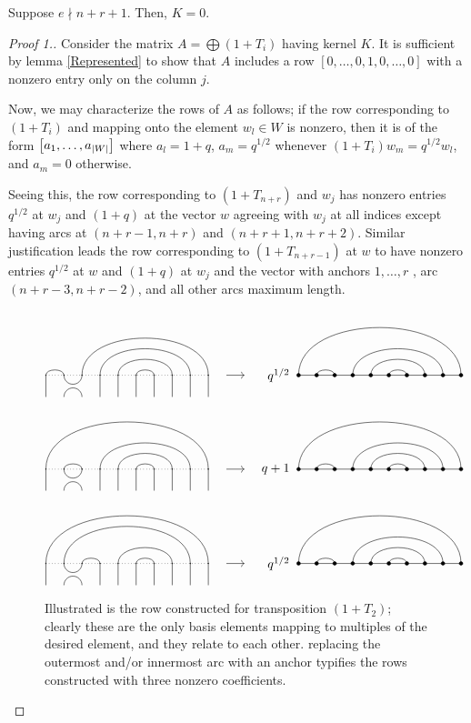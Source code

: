 \documentclass{amsart}
\begin{document}
\begin{lemma}\label{Trivial}
  Suppose $e \nmid n + r + 1$.
  Then, $K = 0$.
\end{lemma}
\begin{proof}[Proof 1.]
  Consider the matrix $A = \bigoplus (1 + T_i)$ having kernel $K$.
  It is sufficient by lemma \ref{Represented} to show that $A$ includes a row $[0,\dots,0,1,0,\dots,0]$ with a nonzero entry only on the column $j$.

  Now, we may characterize the rows of $A$ as follows;
  if the row corresponding to $(1 + T_i)$ and mapping onto the element $w_l \in W$ is nonzero, then it is of the form $\left[ a_1,\dots,a_{\left| W \right|} \right]$ where $a_l = 1 + q$, $a_m = q^{1/2}$ whenever $(1 + T_i)w_m = q^{1/2}w_l$, and $a_m = 0$ otherwise.
  
  Seeing this, the row corresponding to $(1 + T_{n + r})$ and $w_j$ has nonzero entries $q^{1/2}$ at $w_j$ and $(1 + q)$ at the vector $w$ agreeing with $w_j$ at all indices except having arcs at $(n+r-1,n+r)$ and $(n+r+1,n+r+2)$.
  Similar justification leads the row corresponding to $(1 + T_{n+r-1})$ at $w$ to have nonzero entries $q^{1/2}$ at $w$ and $(1 + q)$ at $w_j$ and the vector with anchors $1,\dots,r$ , arc $(n+r-3,n+r-2)$, and all other arcs maximum length.
  
  \begin{figure}
   \[
     \Action{10}{1/2,3/10,4/9,5/8,6/7}{2}{1/10,2/3,4/9,5/8,6/7}{q^{1/2}}
   \]
   \[
     \Action{10}{1/10,2/3,4/9,5/8,6/7}{2}{1/10,2/3,4/9,5/8,6/7}{q+1}
   \]
   \[
     \Action{10}{1/10,2/9,3/4,5/8,6/7}{2}{1/10,2/3,4/9,5/8,6/7}{q^{1/2}}
   \]
   \caption{Illustrated is the row constructed for transposition $(1 + T_2)$; clearly these are the only basis elements mapping to multiples of the desired element, and they relate to each other.
     replacing the outermost and/or innermost arc with an anchor typifies the rows constructed with three nonzero coefficients.}
 \label{Submatrix}
\end{figure}
 

\end{proof}
\end{document}

